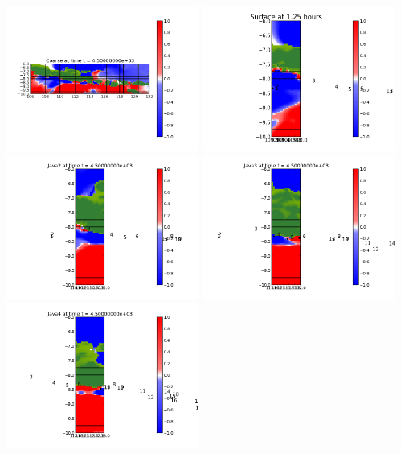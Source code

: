 \documentclass[11pt]{article}
\begin{document}
\vskip 10pt 
\includegraphics[width=0.475\textwidth]{frame0005fig0.png}
\includegraphics[width=0.475\textwidth]{frame0005fig15.png}
\vskip 10pt 
\includegraphics[width=0.475\textwidth]{frame0005fig25.png}
\includegraphics[width=0.475\textwidth]{frame0005fig20.png}
\vskip 10pt 
\includegraphics[width=0.475\textwidth]{frame0005fig30.png}
\end{document}
